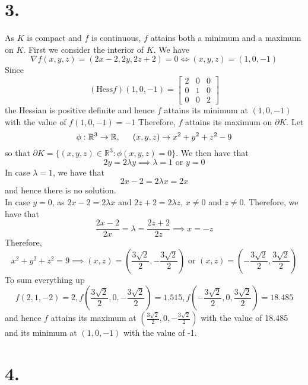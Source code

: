 \documentclass[11pt]{article}
\begin{document}
\section*{3.}
As $K$ is compact and $f$ is continuous, $f$ attains both a minimum and a maximum on $K$. First we consider the interior of $K$.
We have
\[
    \nabla f(x,y,z) = (2x-2,2y,2z+2) = 0 \iff (x,y,z) = (1,0,-1)
\]
Since 
\[
    (\text{Hess} f)(1,0,-1) = 
    \begin{bmatrix}
        2 & 0 & 0 \\
        0 & 1 & 0 \\
        0 & 0 & 2 
    \end{bmatrix}    
\]
the Hessian is positive definite and hence $f$ attains its minimum at $(1,0,-1)$ with the value of $f(1,0,-1) = -1$ Therefore, $f$ attains its maximum on 
$\partial K$. Let 
\[
    \phi: \mathbb{R}^3 \to \mathbb{R}, \indent (x,y,z) \to x^2 + y^2 + z^2 - 9    
\]
so that $\partial K = \{(x,y,z)\in \mathbb{R}^3: \phi(x,y,z) = 0\}$. We then have that 
\[
    2y = 2\lambda y \implies \lambda = 1 \text{ or } y=0
\]
In case $\lambda = 1$, we have that 
\[
    2x-2 = 2\lambda x = 2x  
\]
and hence there is no solution. \\
In case $y=0$, as $2x-2=2\lambda x$ and $2z+2 = 2\lambda z$, $x\ne 0$ and $z\ne 0$. Therefore, we have that
\[
    \frac{2x-2}{2x} = \lambda = \frac{2z+2}{2z} \implies x = -z    
\]
Therefore, 
\[
    x^2+y^2+z^2=9 \implies (x,z) = \left(\frac{3\sqrt{2}}{2},-\frac{3\sqrt{2}}{2}\right) \text{ or } (x,z) = \left(-\frac{3\sqrt{2}}{2},\frac{3\sqrt{2}}{2}\right)    
\]
To sum everything up 
\[
    f(2,1,-2) = 2, f\left(\frac{3\sqrt{2}}{2},0,-\frac{3\sqrt{2}}{2}\right) = 1.515, f\left(-\frac{3\sqrt{2}}{2},0,\frac{3\sqrt{2}}{2}\right) = 18.485 
\]
and hence $f$ attains its maximum at $\left(\frac{3\sqrt{2}}{2},0,-\frac{3\sqrt{2}}{2}\right)$ with the value of 18.485
and its minimum at $(1,0,-1)$ with the value of -1.
\pagebreak
\section*{4.}
\end{document}
